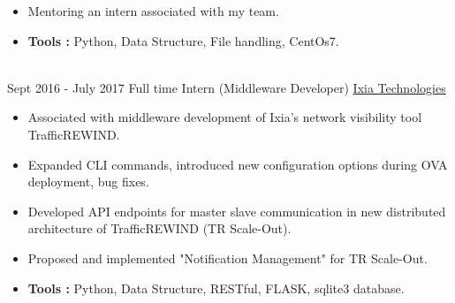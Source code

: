 \documentclass[letterpaper]{twentysecondcv} %
\begin{document}
\begin{twenty}
{{\begin{itemize}
        \item Mentoring an intern associated with my team.
		\item \textbf{Tools :} Python, Data Structure, File handling, CentOs7.
    \end{itemize}}
        }
     \\
     \twentyitem
   		{Sept 2016 -}
		{July 2017}
        {Full time Intern (Middleware Developer)}
        {\href{https://www.ixiacom.com/}{Ixia Technologies}}
        {}
        {
        \begin{itemize}
        \item Associated with middleware development of Ixia's network visibility tool TrafficREWIND.
	\item  Expanded CLI commands, introduced new configuration options during OVA deployment, bug fixes.
        \item Developed API endpoints for master slave communication in new distributed architecture of TrafficREWIND (TR Scale-Out).
		\item Proposed and implemented "Notification Management" for TR Scale-Out.
		\item \textbf{Tools :} Python, Data Structure, RESTful, FLASK, sqlite3 database.
    \end{itemize}
    	}
        
\end{twenty}

\end{document}
